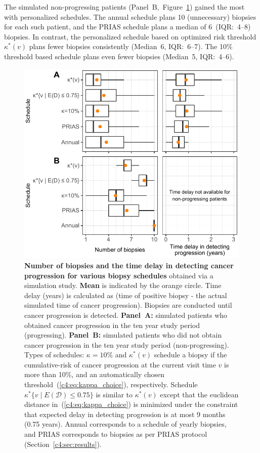 The simulated non-progressing patients (Panel~B,~Figure~\ref{c4:fig:6}) gained the most with personalized schedules. The annual schedule plans 10 (unnecessary) biopsies for each such patient, and the PRIAS schedule plans a median of 6~(IQR:~4--8) biopsies. In contrast, the personalized schedule based on optimized risk threshold $\kappa^*(v)$ plans fewer biopsies consistently (Median~6, IQR:~6--7). The 10\% threshold based schedule plans even fewer biopsies (Median~5, IQR:~4--6).

\begin{figure}
\centerline{\includegraphics{contents/c4/images/c4_fig6.pdf}}
\caption{\textbf{Number of biopsies and the time delay in detecting cancer progression for various biopsy schedules} obtained via a simulation study. \textbf{Mean} is indicated by the orange circle. Time delay (years) is calculated as (time of positive biopsy - the actual simulated time of cancer progression). Biopsies are conducted until cancer progression is detected. \textbf{Panel~A:} simulated patients who obtained cancer progression in the ten year study period (progressing). \textbf{Panel~B:} simulated patients who did not obtain cancer progression in the ten year study period (non-progressing). Types of schedules: ${\kappa=10\%}$ and $\kappa^*(v)$ schedule a biopsy if the cumulative-risk of cancer progression at the current visit time $v$ is more than 10\%, and an automatically chosen threshold~(\ref{c4:eq:kappa_choice}), respectively. Schedule ${\kappa^*\{v \mid E(\mathcal{D})\leq 0.75\}}$ is similar to $\kappa^*(v)$ except that the euclidean distance in~(\ref{c4:eq:kappa_choice}) is minimized under the constraint that expected delay in detecting progression is at most 9 months (0.75 years). Annual corresponds to a schedule of yearly biopsies, and PRIAS corresponds to biopsies as per PRIAS protocol (Section~\ref{c4:sec:results}).}
\label{c4:fig:6}
\end{figure}